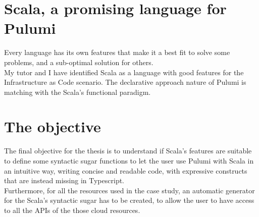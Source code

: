 \section{Scala, a promising language for Pulumi}
Every language has its own features that make it a best fit to solve some problems, and a sub-optimal solution for others.\\
My tutor and I have identified Scala as a language with good features for the Infrastructure as Code scenario.
The declarative approach nature of Pulumi is matching with the Scala's functional paradigm.

\section{The objective}
The final objective for the thesis is to understand if Scala's features are suitable to define some syntactic sugar functions to let the user use Pulumi with Scala in an intuitive way, writing concise and readable code, with expressive constructs that are instead missing in Typescript.\\
Furthermore, for all the resources used in the case study, an automatic generator for the Scala's syntactic sugar has to be created, to allow the user to have access to all the APIs of the those cloud resources.



